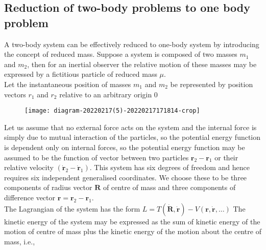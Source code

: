 \subsection{Reduction of two-body problems to one body problem}
A two-body system can be effectively reduced to one-body system by introducing the concept of reduced mass. Suppose a system is composed of two masses $m_{1}$ and $m_{2}$, then for an inertial observer the relative motion of these masses may be expressed by a fictitious particle of reduced mass $\mu$.\\
Let the instantaneous position of masses $m_{1}$ and $m_{2}$ be represented by position vectors $r_{1}$ and $r_{2}$ relative to an arbitrary origin 0\\
\begin{figure}[H]
	\centering
	\texttt{[image: diagram-20220217(5)-20220217171814-crop]}
	\caption{}
	\label{}
\end{figure}
Let us assume that no external force acts on the system and the internal force is simply due to mutual interaction of the particles, so the potential energy function is dependent only on internal forces, so the potential energy function may be assumed to be the function of vector between two particles $\mathbf{r}_{2}-\mathbf{r}_{1}$ or their relative velocity $\left(\dot{\mathbf{r}}_{2}-\dot{\mathbf{r}}_{1}\right) .$ This system has six degrees of freedom and hence requires six independent generalised coordinates. We choose these to be three components of radius vector $\mathbf{R}$ of centre of mass and three components of difference vector $\mathbf{r}=\mathbf{r}_{2}-\mathbf{r}_{1}$.\\
The Lagrangian of the system has the form $L=T(\dot{\mathbf{R}}, \dot{\mathbf{r}})-V(\mathbf{r}, \dot{\mathbf{r}}, \ldots)$
The kinetic energy of the system may be expressed as the sum of kinetic energy of the motion of centre of mass plus the kinetic energy of the motion about the centre of mass, i.e.,
